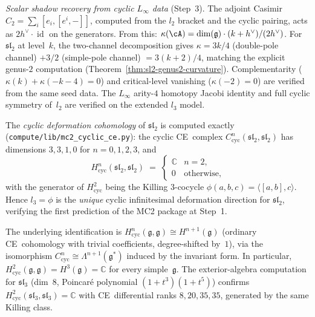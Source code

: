 \item \emph{Scalar shadow recovery from cyclic $L_\infty$ data}
  \textup{(}Step~3\textup{)}.
  The adjoint Casimir $C_2 = \sum_i [e_i,[e^i,-]]$, computed from the
  $l_2$ bracket and the cyclic pairing, acts as $2h^\vee\cdot\operatorname{id}$
  on the generators.  From this:
  $\kappa(\cA) = \dim(\mathfrak{g})\cdot(k+h^\vee)/(2h^\vee)$.
  For $\mathfrak{sl}_2$ at level~$k$, the two-channel decomposition
  gives $\kappa = 3k/4$ (double-pole channel) $+ 3/2$
  (simple-pole channel) $= 3(k+2)/4$,
  matching the explicit genus-$2$ computation
  (Theorem~\ref{thm:sl2-genus2-curvature}).
  Complementarity ($\kappa(k)+\kappa(-k-4)=0$) and critical-level vanishing
  ($\kappa(-2)=0$) are verified from the same seed data.
  The $L_\infty$ arity-$4$ homotopy Jacobi identity and full cyclic symmetry
  of~$l_2$ are verified on the extended $l_3$ model.

\item The \emph{cyclic deformation cohomology} of $\mathfrak{sl}_2$
  is computed exactly
  \textup{(}\nolinkurl{compute/lib/mc2_cyclic_ce.py}\textup{)}:
  the cyclic CE~complex
  $C^n_{\mathrm{cyc}}(\mathfrak{sl}_2, \mathfrak{sl}_2)$
  has dimensions $3, 3, 1, 0$ for $n = 0, 1, 2, 3$, and
  \[
  H^n_{\mathrm{cyc}}(\mathfrak{sl}_2, \mathfrak{sl}_2)
  \;=\;
  \begin{cases}
  \mathbb{C} & n = 2,\\
  0 & \text{otherwise},
  \end{cases}
  \]
  with the generator of $H^2_{\mathrm{cyc}}$ being the
  Killing $3$-cocycle
  $\phi(a,b,c) = \langle [a,b], c \rangle$.
  Hence $l_3 = \phi$ is the \emph{unique}
  cyclic infinitesimal deformation direction for
  $\mathfrak{sl}_2$, verifying the first prediction
  of the MC2 package at Step~1.

  The underlying identification is
  $H^n_{\mathrm{cyc}}(\mathfrak{g},\mathfrak{g})\cong
  H^{n+1}(\mathfrak{g})$ (ordinary CE~cohomology with trivial
  coefficients, degree-shifted by~$1$), via the isomorphism
  $C^n_{\mathrm{cyc}}\cong \Lambda^{n+1}(\mathfrak{g}^*)$
  induced by the invariant form.
  In particular, $H^2_{\mathrm{cyc}}(\mathfrak{g},\mathfrak{g})
  =H^3(\mathfrak{g})=\mathbb{C}$ for every simple~$\mathfrak{g}$.
  The exterior-algebra computation for $\mathfrak{sl}_3$
  (dim~$8$, Poincar\'{e} polynomial $(1+t^3)(1+t^5)$)
  confirms $H^2_{\mathrm{cyc}}(\mathfrak{sl}_3,\mathfrak{sl}_3)=\mathbb{C}$
  with CE~differential ranks $8, 20, 35, 35$,
  generated by the same Killing class.

